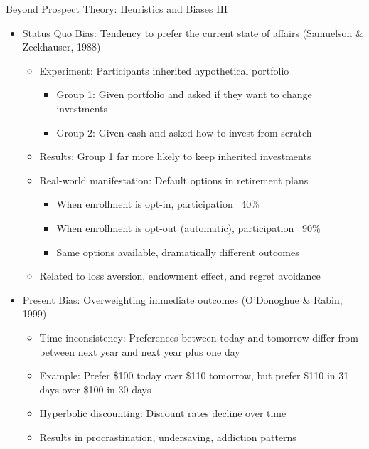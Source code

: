 \documentclass[10pt]{beamer}
\begin{document}
\begin{frame}{Beyond Prospect Theory: Heuristics and Biases III}
  \begin{itemize}[<+->]
    \item Status Quo Bias: Tendency to prefer the current state of affairs (Samuelson \& Zeckhauser, 1988)
      \begin{itemize}
        \item Experiment: Participants inherited hypothetical portfolio
          \begin{itemize}
            \item Group 1: Given portfolio and asked if they want to change investments
            \item Group 2: Given cash and asked how to invest from scratch
          \end{itemize}
        \item Results: Group 1 far more likely to keep inherited investments
        \item Real-world manifestation: Default options in retirement plans
          \begin{itemize}
            \item When enrollment is opt-in, participation ~40\%
            \item When enrollment is opt-out (automatic), participation ~90\%
            \item Same options available, dramatically different outcomes
          \end{itemize}
        \item Related to loss aversion, endowment effect, and regret avoidance
      \end{itemize}
    \item Present Bias: Overweighting immediate outcomes (O'Donoghue \& Rabin, 1999)
      \begin{itemize}
        \item Time inconsistency: Preferences between today and tomorrow differ from between next year and next year plus one day
        \item Example: Prefer \$100 today over \$110 tomorrow, but prefer \$110 in 31 days over \$100 in 30 days
        \item Hyperbolic discounting: Discount rates decline over time
        \item Results in procrastination, undersaving, addiction patterns
      \end{itemize}
  \end{itemize}
\end{frame}
\end{document}
